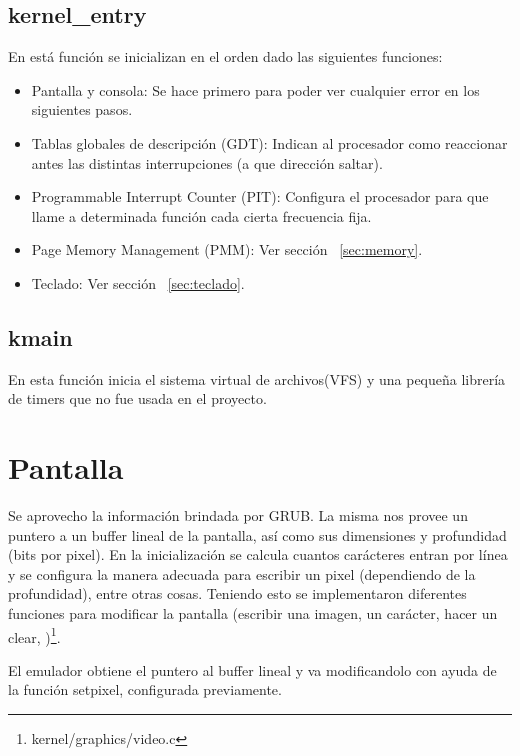 \subsection[kernel\_entry]{kernel\_entry\protect\footnotemark{}\protect{}}
En está función se inicializan en el orden dado las siguientes funciones:
\begin{itemize}
\item Pantalla y consola: Se hace primero para poder ver cualquier error en los siguientes pasos.
\item Tablas globales de descripción (GDT): Indican al procesador como reaccionar antes las distintas interrupciones (a que dirección saltar).
\item Programmable Interrupt Counter (PIT): Configura el procesador para que llame a determinada función cada cierta frecuencia fija.
\item Page Memory Management (PMM): Ver sección ~\ref{sec:memory}.
\item Teclado: Ver sección ~\ref{sec:teclado}.
\end{itemize}

\subsection[kmain]{kmain\protect\footnotemark{}\protect{}}
En esta función inicia el sistema virtual de archivos(VFS) y una pequeña librería de timers que no fue usada en el proyecto.


\section{Pantalla}\label{sec:pantalla}
Se aprovecho la información brindada por GRUB. La misma nos provee un puntero a un buffer lineal de la pantalla, así como sus dimensiones y profundidad (bits por pixel). En la inicialización se calcula cuantos carácteres entran por línea y se configura la manera adecuada para  escribir un pixel (dependiendo de la profundidad), entre otras cosas.
Teniendo esto se implementaron diferentes funciones para modificar la  pantalla (escribir una imagen, un carácter, hacer un clear, \etc)\footnote{kernel/graphics/video.c}.

El emulador obtiene el puntero al buffer lineal y va modificandolo con ayuda de la función setpixel, configurada previamente.

